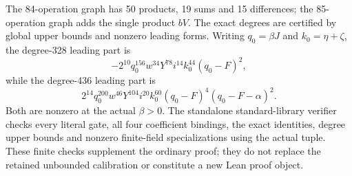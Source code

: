 The 84-operation graph has 50 products, 19 sums and 15 differences;
the 85-operation graph adds the single product $bV$.  The exact degrees
are certified by global upper bounds and nonzero leading forms.
Writing $q_0=\beta J$ and $k_0=\eta+\zeta$, the degree-328 leading
part is
\[
 -2^{10}q_0^{156}w^{34}Y^{78}i^{14}k_0^{44}(q_0-F)^2,
\]
while the degree-436 leading part is
\[
 2^{14}q_0^{200}w^{46}Y^{104}i^{20}k_0^{60}
 (q_0-F)^4(q_0-F-\alpha)^2.
\]
Both are nonzero at the actual $\beta>0$.
The standalone standard-library verifier checks every literal gate,
all four coefficient bindings, the exact identities, degree upper
bounds and nonzero finite-field specializations using the actual tuple.
These finite checks supplement the ordinary proof; they do not replace
the retained unbounded calibration or constitute a new Lean proof object.
